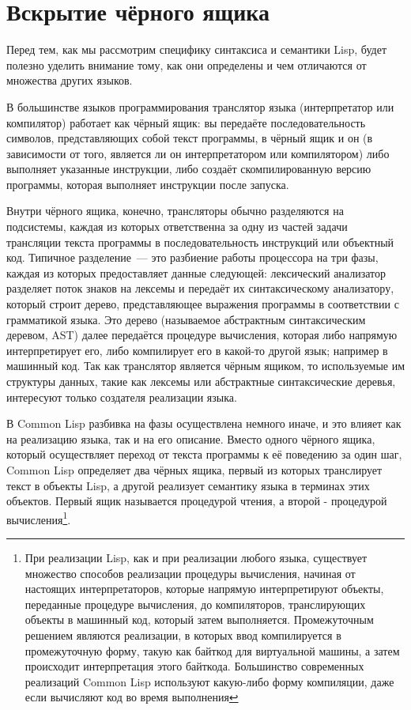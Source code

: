 \section{Вскрытие чёрного ящика}

Перед тем, как мы рассмотрим специфику синтаксиса и семантики Lisp, будет полезно уделить
внимание тому, как они определены и чем отличаются от множества других языков.

В большинстве языков программирования транслятор языка (интерпретатор или компилятор)
работает как чёрный ящик: вы передаёте последовательность символов, представляющих собой
текст программы, в чёрный ящик и он (в зависимости от того, является ли он интерпретатором
или компилятором) либо выполняет указанные инструкции, либо создаёт скомпилированную
версию программы, которая выполняет инструкции после запуска.

Внутри чёрного ящика, конечно, трансляторы обычно разделяются на подсистемы, каждая из
которых ответственна за одну из частей задачи трансляции текста программы в
последовательность инструкций или объектный код. Типичное разделение~--- это разбиение
работы процессора на три фазы, каждая из которых предоставляет данные следующей:
лексический анализатор разделяет поток знаков на лексемы и передаёт их синтаксическому
анализатору, который строит дерево, представляющее выражения программы в соответствии с
грамматикой языка. Это дерево (называемое абстрактным синтаксическим деревом, AST) далее
передаётся процедуре вычисления, которая либо напрямую интерпретирует его, либо
компилирует его в какой-то другой язык; например в машинный код. Так как транслятор
является чёрным ящиком, то используемые им структуры данных, такие как лексемы или
абстрактные синтаксические деревья, интересуют только создателя реализации языка.

В Common Lisp разбивка на фазы осуществлена немного иначе, и это влияет как на реализацию
языка, так и на его описание. Вместо одного чёрного ящика, который осуществляет переход от
текста программы к её поведению за один шаг, Common Lisp определяет два чёрных ящика,
первый из которых транслирует текст в объекты Lisp, а другой реализует семантику языка в
терминах этих объектов. Первый ящик называется процедурой чтения, а второй - процедурой
вычисления\footnote{При реализации Lisp, как и при
  реализации любого языка, существует множество способов реализации процедуры вычисления,
  начиная от настоящих интерпретаторов, которые напрямую интерпретируют объекты,
  переданные процедуре вычисления, до компиляторов, транслирующих объекты в машинный код,
  который затем выполняется. Промежуточным решением являются реализации, в которых ввод
  компилируется в промежуточную форму, такую как байткод для виртуальной машины, а затем
  происходит интерпретация этого байткода. Большинство современных реализаций Common Lisp
  используют какую-либо форму компиляции, даже если вычисляют код во время выполнения}.

